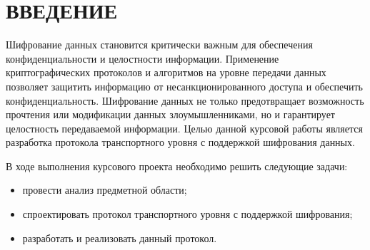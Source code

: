 \section*{ВВЕДЕНИЕ}

Шифрование данных становится критически важным для обеспечения конфиденциальности и целостности информации. Применение криптографических протоколов и алгоритмов на уровне передачи данных позволяет защитить информацию от несанкционированного доступа и обеспечить конфиденциальность. Шифрование данных не только предотвращает возможность прочтения или модификации данных злоумышленниками, но и гарантирует целостность передаваемой информации. Целью данной курсовой работы является разработка протокола транспортного уровня с поддержкой шифрования данных.

В ходе выполнения курсового проекта необходимо решить следующие задачи:

\begin{itemize}
	\item провести анализ предметной области;
	\item спроектировать протокол транспортного уровня с поддержкой шифрования;
	\item разработать и реализовать данный протокол.
\end{itemize}

\pagebreak
